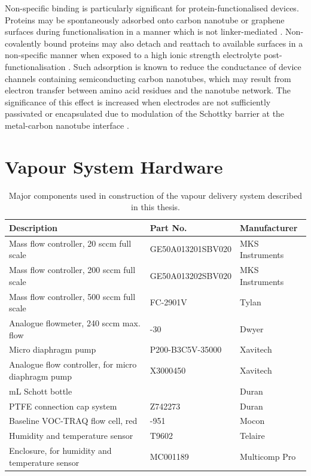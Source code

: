 \documentclass[
  a4paper,
]{scrbook}
\begin{document}
Non-specific binding is particularly significant for
protein-functionalised devices. Proteins may be spontaneously adsorbed
onto carbon nanotube or graphene surfaces during functionalisation in a
manner which is not linker-mediated
\autocite{Bradley2004,Star2003a,Chen2004}. Non-covalently bound proteins
may also detach and reattach to available surfaces in a non-specific
manner when exposed to a high ionic strength electrolyte
post-functionalisation \autocite{Dung2018}. Such adsorption is known to
reduce the conductance of device channels containing semiconducting
carbon nanotubes, which may result from electron transfer between amino
acid residues and the nanotube network. The significance of this effect
is increased when electrodes are not sufficiently passivated or
encapsulated due to modulation of the Schottky barrier at the
metal-carbon nanotube interface \autocite{Chen2004}.

\cleardoublepage
{}
{}
\appendix

\hypertarget{sec-vapour-sensor-components}{%
\chapter{Vapour System Hardware}\label{sec-vapour-sensor-components}}

\hypertarget{tbl-vapour-sensor-components}{}
\begin{longtable}[t]{>{\raggedright\arraybackslash}p{5.5cm}>{\raggedright\arraybackslash}p{4.5cm}>{\raggedright\arraybackslash}p{3.75cm}}
\caption{\label{tbl-vapour-sensor-components}Major components used in construction of the vapour delivery system
described in this thesis. }\tabularnewline

\toprule
Description & Part No. & Manufacturer\\
\midrule
Mass flow controller, 20 sccm full scale & GE50A013201SBV020 & MKS Instruments\\
Mass flow controller, 200 sccm full scale & GE50A013202SBV020 & MKS Instruments\\
Mass flow controller, 500 sccm full scale & FC-2901V & Tylan\\
Analogue flowmeter, 240 sccm max. flow & 116261-30 & Dwyer\\
Micro diaphragm pump & P200-B3C5V-35000 & Xavitech\\
\addlinespace
Analogue flow controller, for micro diaphragm pump & X3000450 & Xavitech\\
10 mL Schott bottle & 218010802 & Duran\\
PTFE connection cap system & Z742273 & Duran\\
Baseline VOC-TRAQ flow cell, red & 043-951 & Mocon\\
Humidity and temperature sensor & T9602 & Telaire\\
\addlinespace
Enclosure, for humidity and temperature sensor & MC001189 & Multicomp Pro\\
\bottomrule
\end{longtable}
\end{document}
